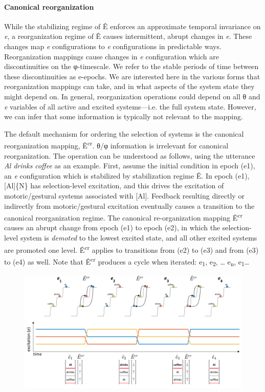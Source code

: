 \paragraph{Canonical reorganization}

While the stabilizing regime of Ê enforces an approximate temporal invariance on \textit{e}, a reorganization regime of Ê causes intermittent, abrupt changes in \textit{e}. These changes map \textit{e} configurations to \textit{e} configurations in predictable ways. Reorganization mappings cause changes in \textit{e} configuration which are discontinuities on the φ-timescale. We refer to the stable periods of time between these discontinuities as e-epochs. We are interested here in the various forms that reorganization mappings can take, and in what aspects of the system state they might depend on. In general, reorganization operations could depend on all θ and \textit{e} variables of all active and excited systems—i.e. the full system state. However, we can infer that some information is typically not relevant to the mapping. 

  The default mechanism for ordering the selection of systems is the canonical reorganization mapping, Ê\textsuperscript{cr}. θ/φ information is irrelevant for canonical reorganization. The operation  can be understood as follows, using the utterance \textit{Al} \textit{drinks} \textit{coffee} as an example. First, assume the initial condition in epoch (e1), an \textit{e} configuration which is stabilized by stabilization regime Ê. In epoch (e1), [Al]\{N\} has selection-level excitation, and this drives the excitation of motoric/gestural systems associated with [Al]. Feedback resulting directly or indirectly from motoric/gestural excitation eventually causes a transition to the canonical reorganization regime. The canonical re-organization mapping Ê\textsuperscript{cr} causes an abrupt change from epoch (e1) to epoch (e2), in which the selection-level system is \textit{demoted} to the lowest excited state, and all other excited systems are promoted one level. Ê\textsuperscript{cr} applies to transitions from (e2) to (e3) and from (e3) to (e4) as well. Note that Ê\textsuperscript{cr} produces a cycle when iterated: e\textsubscript{1}, e\textsubscript{2}, … e\textsubscript{n}, e\textsubscript{1}… 

  
\begin{figure}
\includegraphics[width=\textwidth]{figures/Tilsen-img25.png}
\caption{\missingcaption}
\label{fig:}
\end{figure}
 

